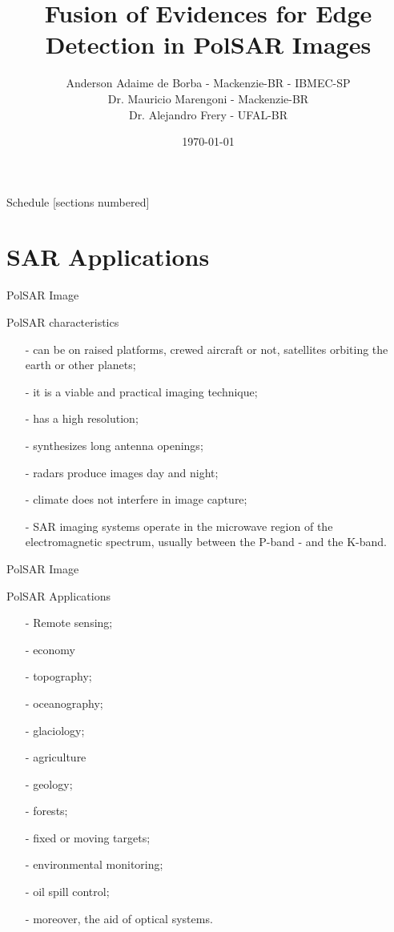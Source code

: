 \documentclass[10pt]{beamer}
\title{Fusion of Evidences for Edge Detection in PolSAR Images}
\date{\today}
\author{Anderson Adaime de Borba - Mackenzie-BR - IBMEC-SP\\
        Dr. Mauricio Marengoni - Mackenzie-BR\\
        Dr. Alejandro Frery - UFAL-BR}
\institute{Workshop do PPGEEC- 2019}
\begin{document}
\maketitle

\begin{frame}{Schedule}
  [sections numbered]
  \tableofcontents[hideallsubsections]
\end{frame}

\section{SAR Applications}

\begin{frame}[fragile]{PolSAR Image}
\begin{alertblock}{PolSAR characteristics}
\begin{itemize}
\item[-] can be on raised platforms, crewed aircraft or not, satellites orbiting the  earth or other planets;
\item[-] it is a viable and practical imaging technique;
\item[-] has a high resolution;
\item[-] synthesizes long antenna openings;
\item[-] radars produce images day and night;
\item[-] climate does not interfere in image capture;
\item[-] SAR imaging systems operate in the microwave region of the electromagnetic spectrum, usually between the P-band - and the K-band.
\end{itemize}
\end{alertblock}
\end{frame}

\begin{frame}[fragile]{PolSAR Image}
\begin{alertblock}{PolSAR Applications}
\begin{itemize}
\item[-] Remote sensing;
\item[-] economy
\item[-] topography;
\item[-] oceanography;
\item[-] glaciology;
\item[-] agriculture
\item[-] geology;
\item[-] forests;
\item[-] fixed or moving targets;
\item[-] environmental monitoring;
\item[-] oil spill control;
\item[-] moreover, the aid of optical systems.
\end{itemize}
\end{alertblock}
\end{frame}
\end{document}
